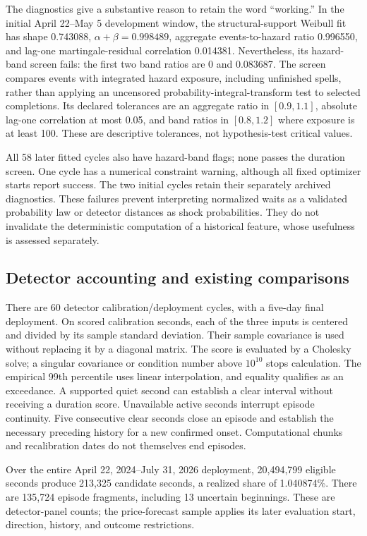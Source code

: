 \documentclass[12pt,letterpaper]{article}
\begin{document}
The diagnostics give a substantive reason to retain the word ``working.'' In the initial April 22--May 5 development window, the structural-support Weibull fit has shape 0.743088, $\alpha+\beta=0.998489$, aggregate events-to-hazard ratio 0.996550, and lag-one martingale-residual correlation 0.014381. Nevertheless, its hazard-band screen fails: the first two band ratios are 0 and 0.083687. The screen compares events with integrated hazard exposure, including unfinished spells, rather than applying an uncensored probability-integral-transform test to selected completions. Its declared tolerances are an aggregate ratio in $[0.9,1.1]$, absolute lag-one correlation at most 0.05, and band ratios in $[0.8,1.2]$ where exposure is at least 100. These are descriptive tolerances, not hypothesis-test critical values.

All 58 later fitted cycles also have hazard-band flags; none passes the duration screen. One cycle has a numerical constraint warning, although all fixed optimizer starts report success. The two initial cycles retain their separately archived diagnostics. These failures prevent interpreting normalized waits as a validated probability law or detector distances as shock probabilities. They do not invalidate the deterministic computation of a historical feature, whose usefulness is assessed separately.

\subsection{Detector accounting and existing comparisons}
There are 60 detector calibration/deployment cycles, with a five-day final deployment. On scored calibration seconds, each of the three inputs is centered and divided by its sample standard deviation. Their sample covariance is used without replacing it by a diagonal matrix. The score is evaluated by a Cholesky solve; a singular covariance or condition number above $10^{10}$ stops calculation. The empirical 99th percentile uses linear interpolation, and equality qualifies as an exceedance. A supported quiet second can establish a clear interval without receiving a duration score. Unavailable active seconds interrupt episode continuity. Five consecutive clear seconds close an episode and establish the necessary preceding history for a new confirmed onset. Computational chunks and recalibration dates do not themselves end episodes.

Over the entire April 22, 2024--July 31, 2026 deployment, 20,494,799 eligible seconds produce 213,325 candidate seconds, a realized share of 1.040874\%. There are 135,724 episode fragments, including 13 uncertain beginnings. These are detector-panel counts; the price-forecast sample applies its later evaluation start, direction, history, and outcome restrictions.
\end{document}
